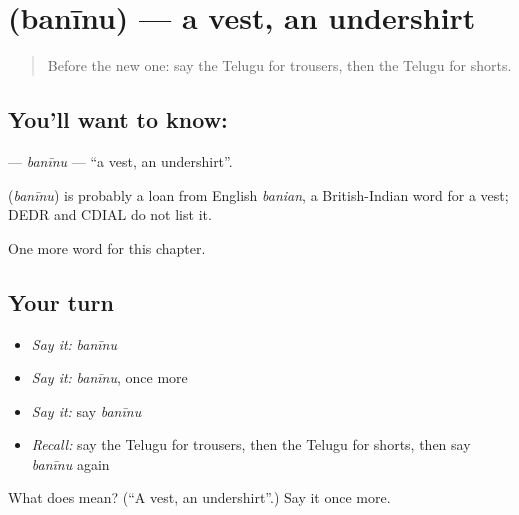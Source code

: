 \section[\texorpdfstring{\te{బనీను} (banīnu)}{బనీను (banīnu)}]{ (banīnu) — a vest, an undershirt}

\label{lesson:TE-C263-baninu}



\begin{quote}
Before the new one: say the Telugu for trousers, then the Telugu for shorts.
\end{quote}

\subsection*{You'll want to know: }
\textbf{} — \emph{banīnu} — \textquotedblleft{}a vest, an undershirt\textquotedblright{}.

\begin{cousinweb}
\textbf{} (\emph{banīnu}) is probably a loan from English \emph{banian}, a British-Indian word for a vest; DEDR and CDIAL do not list it.
\end{cousinweb}

\begin{grammarlens}[title={What you've built}]
One more word for this chapter.
\end{grammarlens}

\subsection*{Your turn}
\begin{itemize}
\raggedright
  \item \emph{Say it:} \emph{banīnu}
  \item \emph{Say it:} \emph{banīnu}, once more
  \item \emph{Say it:} say \emph{banīnu}
  \item \emph{Recall:} say the Telugu for trousers, then the Telugu for shorts, then say \emph{banīnu} again
\end{itemize}

\begin{tcolorbox}[breakable,colback=teal!4,colframe=teal!35!black,title={Before you move on}]
What does  mean? (\textquotedblleft{}A vest, an undershirt\textquotedblright{}.) Say it once more.
\end{tcolorbox}
